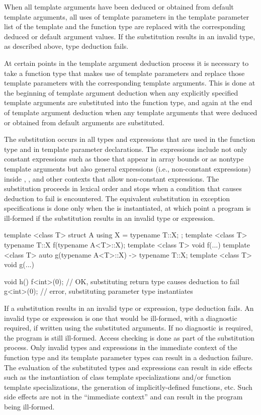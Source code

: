 When all template arguments have been deduced or obtained from
default template arguments, all uses of template parameters in
the template parameter list of the template and the function type
are replaced with the corresponding deduced
or default argument values. If the substitution results in an
invalid type, as described above, type deduction fails.

\pnum
At certain points in the template argument deduction process it is necessary
to take a function type that makes use of template parameters and replace those
template parameters with the corresponding template arguments. This is done at
the beginning of template argument deduction when any explicitly specified
template arguments are substituted into the function type, and again at the end
of template argument deduction when any template arguments that were deduced or
obtained from default arguments are substituted.

\pnum
The substitution occurs in all types and expressions that are used in the function
type and in template parameter declarations. The expressions include not only
constant expressions such as those that appear in array bounds or as nontype
template arguments but also general expressions (i.e., non-constant expressions)
inside , , and other contexts that allow non-constant
expressions. The substitution proceeds in lexical order and stops when
a condition that causes deduction to fail is encountered. \enternote The equivalent substitution in exception specifications is
done only when the  is instantiated, at which point a program is ill-formed
if the substitution results in an invalid type or
expression. \exitnote
\enterexample
\begin{codeblock}
template <class T> struct A { using X = typename T::X; };
template <class T> typename T::X f(typename A<T>::X);
template <class T> void f(...) { }
template <class T> auto g(typename A<T>::X) -> typename T::X;
template <class T> void g(...) { }

void h() {
  f<int>(0); // OK, substituting return type causes deduction to fail
  g<int>(0); // error, substituting parameter type instantiates 
}
\end{codeblock}
\exitexample

\pnum
If a substitution results in an invalid type or expression, type deduction fails. An
invalid type or expression is one that would be ill-formed, with a diagnostic
required, if written using the substituted arguments. \enternote If no
diagnostic is required, the program is still ill-formed. Access checking is done
as part of the substitution
process. \exitnote Only invalid types and expressions in the immediate
context of the function type and its template parameter types can result in a deduction
failure. \enternote The evaluation of the substituted types and expressions can result
in side effects such as the instantiation of class template specializations and/or
function template specializations, the generation of implicitly-defined functions,
etc. Such side effects are not in the ``immediate context'' and can result in the
program being ill-formed.\exitnote

